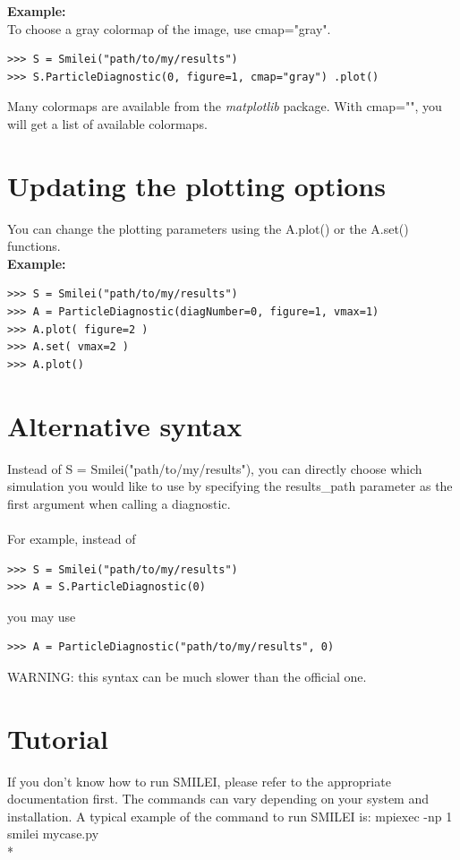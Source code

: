 \documentclass[11pt]{article}
\newcommand{\code}[1]{\colorbox{yellow!15}{\ttfamily #1}}
\begin{document}
\textbf{Example:}\\
To choose a gray colormap of the image, use \code{cmap="gray"}.
\begin{lstlisting}
>>> S = Smilei("path/to/my/results")
>>> S.ParticleDiagnostic(0, figure=1, cmap="gray") .plot()
\end{lstlisting}
Many colormaps are available from the \textit{matplotlib} package. With \code{cmap=""}, you will get a list of available colormaps.


\section{Updating the plotting options}

You can change the plotting parameters using the \code{A.plot()} or the \code{A.set()} functions.\\
\textbf{Example:}
\begin{lstlisting}
>>> S = Smilei("path/to/my/results")
>>> A = ParticleDiagnostic(diagNumber=0, figure=1, vmax=1)
>>> A.plot( figure=2 )
>>> A.set( vmax=2 )
>>> A.plot()
\end{lstlisting}


\section{Alternative syntax}

Instead of \code{S = Smilei("path/to/my/results")}, you can directly choose which simulation you would like to use
by specifying the \code{results\_path} parameter as the first argument when calling a diagnostic.\\
\\
For example, instead of 
\begin{lstlisting}
>>> S = Smilei("path/to/my/results")
>>> A = S.ParticleDiagnostic(0)
\end{lstlisting}
you may use
\begin{lstlisting}
>>> A = ParticleDiagnostic("path/to/my/results", 0)
\end{lstlisting}

WARNING: this syntax can be much slower than the official one.

\clearpage


\section{Tutorial}

If you don't know how to run SMILEI, please refer to the appropriate documentation first. The commands can vary depending on your system and installation. A typical example of the command to run SMILEI is: \code{mpiexec -np 1 smilei mycase.py}\\*
\end{document}
